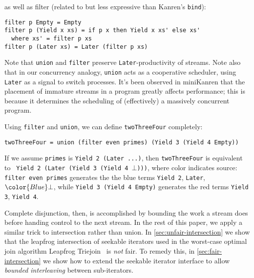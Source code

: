 \documentclass[acmsmall,screen,dvipsnames,svgnames]{acmart}
\newcommand\hask[1]{\texttt{#1}}
\newcommand\ttt\texttt
\newcommand\todo[1]{{\color{Orange}#1}}
\renewcommand\todo[1]{{\color{IndianRed}#1}}
\newcommand\oldtodo[1]{\todo{#1}}
\renewcommand\todo[1]{\ignorespaces}
\begin{document}
\noindent
as well as filter (related to but less expressive than \textmu{}Kanren's \ttt{bind}):

\begin{verbatim}
filter p Empty = Empty
filter p (Yield x xs) = if p x then Yield x xs' else xs'
  where xs' = filter p xs
filter p (Later xs) = Later (filter p xs)
\end{verbatim}

\noindent
Note that \ttt{union} and \ttt{filter} preserve \hask{Later}-productivity of streams.
Note also that in our concurrency analogy, \ttt{union} acts as a cooperative scheduler, using \hask{Later} as a signal to switch processes.
It's been observed in miniKanren that the placement of immature streams in a program greatly affects performance; this is because it determines the scheduling of (effectively) a massively concurrent program.

Using \ttt{filter} and \ttt{union}, we can define \ttt{twoThreeFour} completely:

\begin{verbatim}
twoThreeFour = union (filter even primes) (Yield 3 (Yield 4 Empty))
\end{verbatim}

\noindent
If we assume \ttt{primes} is \ttt{Yield 2 (Later ...)}, then \ttt{twoThreeFour} is equivalent to \ttt{\color{Blue} Yield 2 (Later {\color{Red}(Yield 3 (Yield 4 {\color{Blue}$\bot$}))})}, where color indicates source: \ttt{filter even primes} generates the the blue terms \ttt{\color{Blue}Yield 2}, \ttt{\color{Blue}Later}, $\color{Blue}\bot$, while \ttt{Yield 3 (Yield 4 Empty)} generates the red terms \ttt{\color{Red}Yield 3}, \ttt{\color{Red}Yield 4}.

Complete disjunction, then, is accomplished by bounding the work a stream does before handing control to the next stream.
In the rest of this paper, we apply a similar trick to intersection rather than union.
In \cref{sec:unfair-intersection} we show that the leapfrog intersection of seekable iterators used in the worst-case optimal join algorithm Leapfrog Triejoin~\citep{lftj} is \emph{not} fair.
To remedy this, in \cref{sec:fair-intersection} we show how to extend the seekable iterator interface to allow \emph{bounded interleaving} between sub-iterators.
\oldtodo{TODO: rephrase `bounded interleaving'?}
\todo{TODO: need a section where we explain bounded fairness and how that serves as the analogy for the conjunctive fairness we seek to achieve.}


\end{document}
